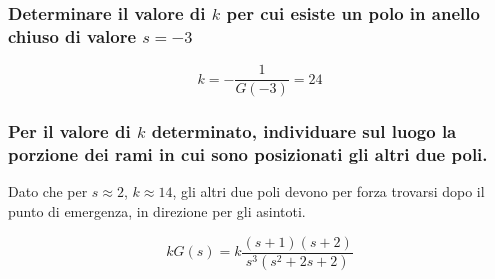 \subsubsection{Determinare il valore di \(k\) per cui esiste un polo in anello chiuso di valore \(s=-3\)}

\[k = -\frac{1}{G(-3)} = 24\]

\subsubsection{Per il valore di \(k\) determinato, individuare sul luogo la porzione dei rami in cui sono posizionati gli altri due poli.}

Dato che per \(s\approx2\), \(k\approx14\), gli altri due poli devono per forza trovarsi dopo il punto di emergenza, in direzione per gli asintoti.

\exercise{}
\[kG(s) = k\frac{(s+1)(s+2)}{s^3(s^2+2s+2)}\]

